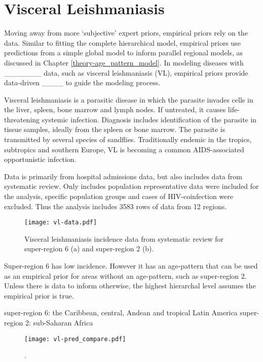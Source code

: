 \chapter{Visceral Leishmaniasis}
\label{applications-priors_empirical}

Moving away from more `subjective' expert priors, empirical priors rely on the data.  Similar to fitting the complete hierarchical model, empirical priors use predictions from a simple global model to inform parallel regional models, as discussed in Chapter \ref{theory-age_pattern_model}.  In modeling diseases with _______ data, such as visceral leishmaniasis (VL), empirical priors provide data-driven ____ to guide the modeling process.

Visceral leishmaniasis is a parasitic disease in which the parasite invades cells in the liver, spleen, bone marrow and lymph nodes.  If untreated, it causes life-threatening systemic infection.  Diagnosis includes identification of the parasite in tissue samples, ideally from the spleen or bone marrow.  The parasite is transmitted by several species of sandflies.  Traditionally  endemic in the tropics, subtropics and southern Europe, VL is becoming a common AIDS-associated opportunistic infection.

Data is primarily from hospital admissions data, but also includes data from systematic review.  Only includes population representative data were included for the analysis, specific population groups and cases of HIV-coinfection were excluded.  Thus the analysis includes 3583 rows of data from 12 regions.

    \begin{figure}[h]
        \begin{center}
            \texttt{[image: vl-data.pdf]}
            \caption{Visceral leishmaniasis incidence data from systematic review for super-region 6 (a) and super-region 2 (b).}
            \label{fig:app-vl data}
        \end{center}
    \end{figure}

Super-region 6 has low incidence.  However it has an age-pattern that can be used as an empirical prior for areas without an age-pattern, such as super-region 2.  Unless there is data to inform otherwise, the highest hierarchal level assumes the empirical prior is true.

super-region 6: the Caribbean, central, Andean and tropical Latin America
super-region 2: sub-Saharan Africa

    \begin{figure}[h]
        \begin{center}
            \texttt{[image: vl-pred\_compare.pdf]}
            \caption{.}
            \label{fig:app-pred compare}
        \end{center}
    \end{figure} 
